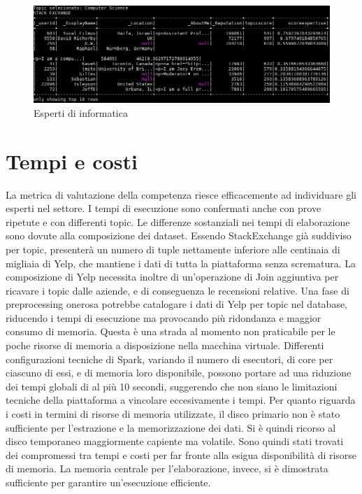 \begin{figure}[H]
	\centering
	\includegraphics[scale=0.7]{image/cs.PNG}
	\caption{Esperti di informatica}
	\label{fig:cs}
\end{figure}

\section{Tempi e costi}
La metrica di valutazione della competenza riesce efficacemente ad individuare gli esperti nel settore. I tempi di esecuzione sono confermati anche con prove ripetute e con differenti topic. Le differenze sostanziali nei tempi di elaborazione sono dovute alla composizione dei dataset. Essendo StackExchange già suddiviso per topic, presenterà un numero di tuple nettamente inferiore alle centinaia di migliaia di Yelp, che mantiene i dati di tutta la piattaforma senza scrematura. La composizione di Yelp necessita inoltre di un'operazione di Join aggiuntiva per ricavare i topic dalle aziende, e di conseguenza le recensioni relative. Una fase di preprocessing onerosa potrebbe catalogare i dati di Yelp per topic nel database, riducendo i tempi di esecuzione ma provocando più ridondanza e maggior consumo di memoria. Questa è una strada al momento non praticabile per le poche risorse di memoria a disposizione nella macchina virtuale. Differenti configurazioni tecniche di Spark, variando il numero di esecutori, di core per ciascuno di essi, e di memoria loro disponibile, possono portare ad una riduzione dei tempi globali di al più 10 secondi, suggerendo che non siano le limitazioni tecniche della piattaforma a vincolare eccesivamente i tempi. Per quanto riguarda i costi in termini di risorse di memoria utilizzate, il disco primario non è stato sufficiente per l'estrazione e la memorizzazione dei dati. Si è quindi ricorso al disco temporaneo maggiormente capiente ma volatile. Sono quindi stati trovati dei compromessi tra tempi e costi per far fronte alla esigua disponibilità di risorse di memoria. La memoria centrale per l'elaborazione, invece, si è dimostrata sufficiente per garantire un'esecuzione efficiente.
